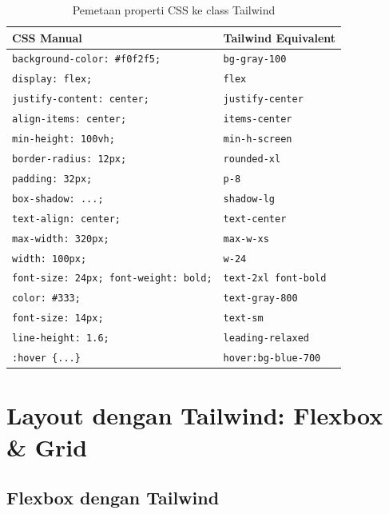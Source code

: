 \begin{table}[htbp]
\centering
\caption{Pemetaan properti CSS ke class Tailwind}
\label{tab:12-pemetaan}
\begin{tabular}{ll}
\toprule
\textbf{CSS Manual} & \textbf{Tailwind Equivalent} \\
\midrule
\texttt{background-color: \#f0f2f5;} & \texttt{bg-gray-100} \\
\texttt{display: flex;} & \texttt{flex} \\
\texttt{justify-content: center;} & \texttt{justify-center} \\
\texttt{align-items: center;} & \texttt{items-center} \\
\texttt{min-height: 100vh;} & \texttt{min-h-screen} \\
\texttt{border-radius: 12px;} & \texttt{rounded-xl} \\
\texttt{padding: 32px;} & \texttt{p-8} \\
\texttt{box-shadow: ...;} & \texttt{shadow-lg} \\
\texttt{text-align: center;} & \texttt{text-center} \\
\texttt{max-width: 320px;} & \texttt{max-w-xs} \\
\texttt{width: 100px;} & \texttt{w-24} \\
\texttt{font-size: 24px; font-weight: bold;} & \texttt{text-2xl font-bold} \\
\texttt{color: \#333;} & \texttt{text-gray-800} \\
\texttt{font-size: 14px;} & \texttt{text-sm} \\
\texttt{line-height: 1.6;} & \texttt{leading-relaxed} \\
\texttt{:hover \{...\}} & \texttt{hover:bg-blue-700} \\
\bottomrule
\end{tabular}
\end{table}

\section{Layout dengan Tailwind: Flexbox \& Grid}
\label{sec:12-layout}

\subsection{Flexbox dengan Tailwind}

